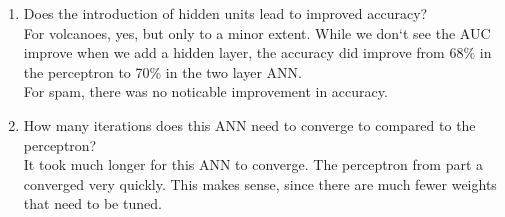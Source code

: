 \documentclass[12pt]{article}
\begin{document}
\begin{enumerate}
    \begin{enumerate}
      \item Does the introduction of hidden units lead to improved accuracy?\\
        For volcanoes, yes, but only to a minor extent. While we don`t see the
        AUC improve when we add a hidden layer, the accuracy did improve from
        68\% in the perceptron to 70\% in the two layer ANN.\\
        For spam, there was no noticable improvement in accuracy.\\

      \item How many iterations does this ANN need to converge to compared to
        the perceptron?\\
        It took much longer for this ANN to converge. The perceptron from part
        a converged very quickly. This makes sense, since there are much fewer
        weights that need to be tuned.\\
    \end{enumerate}


\end{enumerate}
\end{document}
